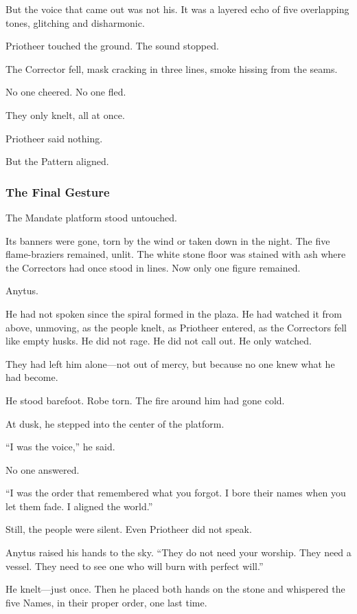 \documentclass[12pt]{article}
\begin{document}
But the voice that came out was not his. It was a layered echo of five overlapping tones, glitching and disharmonic.

Priotheer touched the ground. The sound stopped.

The Corrector fell, mask cracking in three lines, smoke hissing from the seams.

No one cheered. No one fled.

They only knelt, all at once.

Priotheer said nothing.

But the Pattern aligned.

\dotfill

\subsubsection*{The Final Gesture}

The Mandate platform stood untouched.

Its banners were gone, torn by the wind or taken down in the night. The five flame-braziers remained, unlit. The white stone floor was stained with ash where the Correctors had once stood in lines. Now only one figure remained.

Anytus.

He had not spoken since the spiral formed in the plaza. He had watched it from above, unmoving, as the people knelt, as Priotheer entered, as the Correctors fell like empty husks. He did not rage. He did not call out. He only watched.

They had left him alone—not out of mercy, but because no one knew what he had become.

He stood barefoot. Robe torn. The fire around him had gone cold.

At dusk, he stepped into the center of the platform.

“I was the voice,” he said.

No one answered.

“I was the order that remembered what you forgot. I bore their names when you let them fade. I aligned the world.”

Still, the people were silent. Even Priotheer did not speak.

Anytus raised his hands to the sky. “They do not need your worship. They need a vessel. They need to see one who will burn with perfect will.”

He knelt—just once. Then he placed both hands on the stone and whispered the five Names, in their proper order, one last time.
\end{document}
